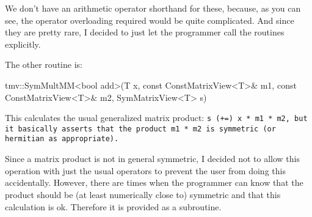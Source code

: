 We don't have an arithmetic operator 
shorthand for these, because, as you can see, the operator
overloading required would be quite complicated.  
And since they are pretty rare, I decided to just let the programmer 
call the routines explicitly.

The other routine is:
\begin{tmvcode}
tmv::SymMultMM<bool add>(T x, const ConstMatrixView<T>& m1, 
      const ConstMatrixView<T>& m2, SymMatrixView<T> s)
\end{tmvcode}
This calculates the usual generalized matrix product:
\tt{s (+=) x * m1 * m2}, but it basically
asserts that the product \tt{m1 * m2} is symmetric (or hermitian as appropriate).

Since a matrix product is not in general symmetric, I decided not to allow 
this operation with just the usual operators to prevent the user from doing 
this accidentally.  However, there are times when the 
programmer can know that the product should be (at least numerically close to)
symmetric and that this calculation is ok.  Therefore it is provided as a subroutine.


